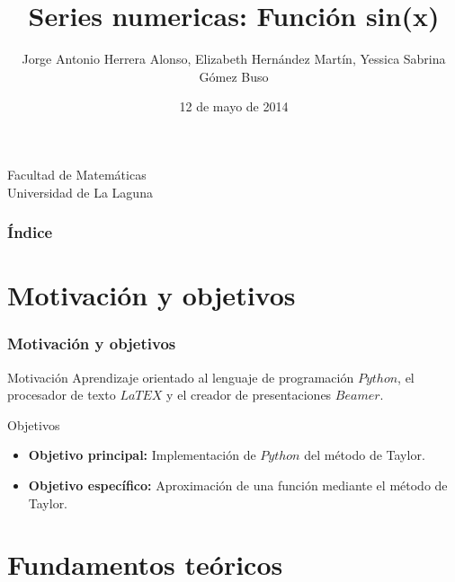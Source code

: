 \documentclass{beamer}
\title[Series numéricas]{Series numericas: Función sin(x)}
\author[Jorge, Elizabeth, Yessica]{Jorge Antonio Herrera Alonso, Elizabeth Hernández Martín, Yessica Sabrina Gómez Buso}
\date[12-05-2014]{12 de mayo de 2014}
\begin{document}
  
\begin{frame}

  \titlepage

  \begin{small}
    \begin{center}
     Facultad de Matemáticas \\
     Universidad de La Laguna
    \end{center}
  \end{small}

\end{frame}

\begin{frame}
  \frametitle{Índice}  
  \tableofcontents[pausesections]
\end{frame}

 

\section{Motivación y objetivos}
\begin{frame}
\frametitle{Motivación y objetivos}
\begin{block}{Motivación}
Aprendizaje orientado al lenguaje de programación $Python$, el procesador de texto $LaTEX$ y el creador de presentaciones $Beamer$.
\end{block}
\begin{block}{Objetivos}
  \begin{itemize}
  \item {\bf Objetivo principal:} Implementación de $Python$ del método de Taylor.\pause
  \item {\bf Objetivo específico:} Aproximación de una función mediante el método de Taylor.
  \end{itemize}
\end{block}


\end{frame}
\section{Fundamentos teóricos}
\end{document}
